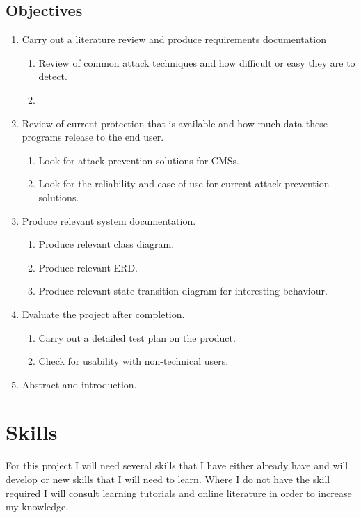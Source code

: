 \subsection*{Objectives}
\begin{enumerate}
    \item Carry out a literature review and produce requirements documentation
    \begin{enumerate}
        \item Review of common attack techniques and how difficult or easy they are to detect.
        \item 
    \end{enumerate}
    \item Review of current protection that is available and how much data these programs release to the end user.
    \begin{enumerate}
        \item Look for attack prevention solutions for CMSs.
        \item Look for the reliability and ease of use for current attack prevention solutions.
    \end{enumerate}
    \item Produce relevant system documentation.
    \begin{enumerate}
        \item Produce relevant class diagram.
        \item Produce relevant ERD. 
        \item Produce relevant state transition diagram for interesting behaviour.
    \end{enumerate}
    \item Evaluate the project after completion.
    \begin{enumerate}
        \item Carry out a detailed test plan on the product.
        \item Check for usability with non-technical users.
    \end{enumerate}
    \item Abstract and introduction.
\end{enumerate}

\section*{Skills}
For this project I will need several skills that I have either already have and will develop or new skills that I will need to learn. Where I do not have the skill required I will consult learning tutorials and online literature in order to increase my knowledge. 

